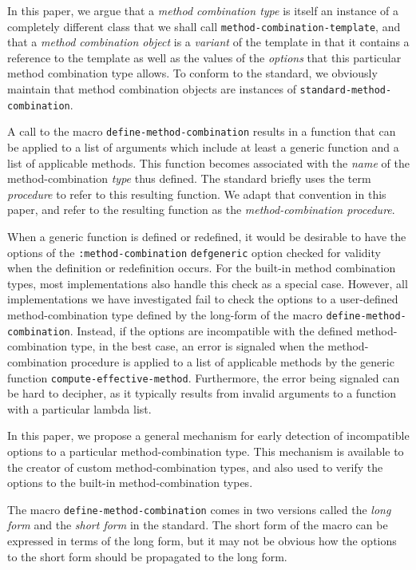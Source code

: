 In this paper, we argue that a \emph{method combination type} is
itself an instance of a completely different class that we shall call
\texttt{method-combination-template}, and that a \emph{method
  combination object} is a \emph{variant} of the template in that it
contains a reference to the template as well as the values of the
\emph{options} that this particular method combination type allows.
To conform to the standard, we obviously maintain that method
combination objects are instances of
\texttt{standard-method-combination}.

A call to the macro \texttt{define-method-combination} results in a
function that can be applied to a list of arguments which include at
least a generic function and a list of applicable methods.  This
function becomes associated with the \emph{name} of the
method-combination \emph{type} thus defined.  The standard briefly
uses the term \emph{procedure} to refer to this resulting function.
We adapt that convention in this paper, and refer to the resulting
function as the \emph{method-combination procedure}.

When a generic function is defined or redefined, it would be desirable
to have the options of the \texttt{:method-combination}
\texttt{defgeneric} option checked for validity when the definition or
redefinition occurs.  For the built-in method combination types, most
implementations also handle this check as a special case.  However,
all implementations we have investigated fail to check the options to
a user-defined method-combination type defined by the long-form of the
macro \texttt{define-method-combination}.  Instead, if the options are
incompatible with the defined method-combination type, in the best
case, an error is signaled when the method-combination procedure is
applied to a list of applicable methods by the generic function
\texttt{compute-effective-method}.  Furthermore, the error being
signaled can be hard to decipher, as it typically results from invalid
arguments to a function with a particular lambda list.

In this paper, we propose a general mechanism for early detection of
incompatible options to a particular method-combination type.  This
mechanism is available to the creator of custom method-combination
types, and also used to verify the options to the built-in
method-combination types.

The macro \texttt{define-method-combination} comes in two versions
called the \emph{long form} and the \emph{short form} in the
\commonlisp{} standard.  The short form of the macro can be expressed
in terms of the long form, but it may not be obvious how the options
to the short form should be propagated to the long form.


